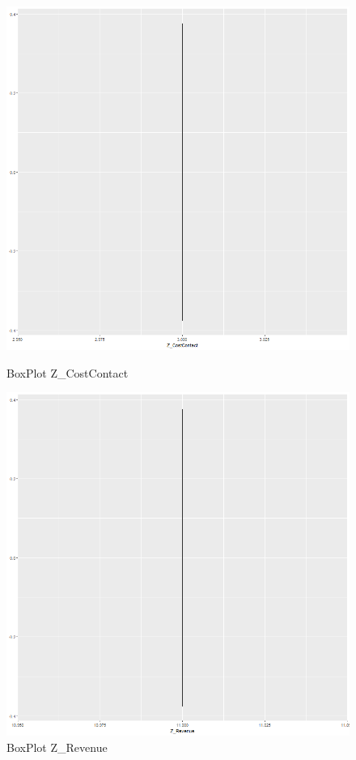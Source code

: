 \documentclass[letterpaper,11pt]{article}
\begin{document}
\begin{figure}[H]
  \centering
  \begin{minipage}[b]{0.4\textwidth}
    \includegraphics[width=\textwidth]{Img/DESCRIPTION/DESCRIPTION018.png}
    \caption{BoxPlot Z\_CostContact}
    \label{fig:ZRevenue}
  \end{minipage}
  \hfill
  \begin{minipage}[b]{0.4\textwidth}
    \includegraphics[width=\textwidth]{Img/DESCRIPTION/DESCRIPTION019.png}
    \caption{BoxPlot Z\_Revenue}
      \label{fig:ZCostContact}
  \end{minipage}
\end{figure}
\end{document}
